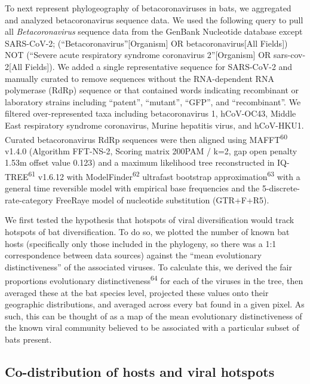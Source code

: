 \documentclass[11pt]{article}
\begin{document}
To next represent phylogeography of betacoronaviruses in bats, we
aggregated and analyzed betacoronavirus sequence data. We used the
following query to pull all \emph{Betacoronavirus} sequence data from
the GenBank Nucleotide database except SARS-CoV-2;
(``Betacoronavirus''{[}Organism{]} OR betacoronavirus{[}All Fields{]})
NOT (``Severe acute respiratory syndrome coronavirus 2''{[}Organism{]}
OR sars-cov-2{[}All Fields{]}). We added a single representative
sequence for SARS-CoV-2 and manually curated to remove sequences without
the RNA-dependent RNA polymerase (RdRp) sequence or that contained words
indicating recombinant or laboratory strains including ``patent'',
``mutant'', ``GFP'', and ``recombinant''. We filtered over-represented
taxa including betacoronavirus 1, hCoV-OC43, Middle East respiratory
syndrome coronavirus, Murine hepatitis virus, and hCoV-HKU1. Curated
betacoronavirus RdRp sequences were then aligned using
MAFFT\textsuperscript{60} v1.4.0 (Algorithm FFT-NS-2, Scoring matrix
200PAM / k=2, gap open penalty 1.53m offset value 0.123) and a maximum
likelihood tree reconstructed in IQ-TREE\textsuperscript{61} v1.6.12
with ModelFinder\textsuperscript{62} ultrafast bootstrap
approximation\textsuperscript{63} with a general time reversible model
with empirical base frequencies and the 5-discrete-rate-category
FreeRaye model of nucleotide substitution (GTR+F+R5).

We first tested the hypothesis that hotspots of viral diversification
would track hotspots of bat diversification. To do so, we plotted the
number of known bat hosts (specifically only those included in the
phylogeny, so there was a 1:1 correspondence between data sources)
against the ``mean evolutionary distinctiveness'' of the associated
viruses. To calculate this, we derived the fair proportions evolutionary
distinctiveness\textsuperscript{64} for each of the viruses in the tree,
then averaged these at the bat species level, projected these values
onto their geographic distributions, and averaged across every bat found
in a given pixel. As such, this can be thought of as a map of the mean
evolutionary distinctiveness of the known viral community believed to be
associated with a particular subset of bats present.

\hypertarget{co-distribution-of-hosts-and-viral-hotspots}{%
\subsection{Co-distribution of hosts and viral
hotspots}\label{co-distribution-of-hosts-and-viral-hotspots}}
\end{document}
